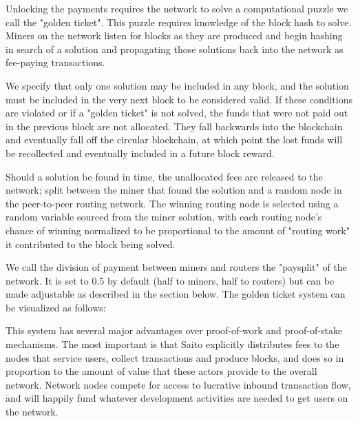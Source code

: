 \documentclass[11pt, oneside]{article}   	%
\begin{document}
\begin{multicols}{2}
Unlocking the payments requires the network to solve a computational puzzle we call the "golden ticket". This puzzle requires knowledge of the block hash to solve. Miners on the network listen for blocks as they are produced and begin hashing in search of a solution and propagating those solutions back into the network as fee-paying transactions. 

We specify that only one solution may be included in any block, and the solution must be included in the very next block to be considered valid. If these conditions are violated or if a "golden ticket" is not solved, the funds that were not paid out in the previous block are not allocated. They fall backwards into the blockchain and eventually fall off the circular blockchain, at which point the lost funds will be recollected and eventually included in a future block reward. 

Should a solution be found in time, the unallocated fees are released to the network; split between the miner that found the solution and a random node in the peer-to-peer routing network. The winning routing node is selected using a random variable sourced from the miner solution, with each routing node's chance of winning normalized to be proportional to the amount of "routing work" it contributed to the block being solved.

We call the division of payment between miners and routers the "paysplit" of the network. It is set to 0.5 by default (half to miners, half to routers) but can be made adjustable as described in the section below. The golden ticket system can be visualized as follows:


This system has several major advantages over proof-of-work and proof-of-stake mechanisms. The most important is that Saito explicitly distributes fees to the nodes that service users, collect transactions and produce blocks, and does so in proportion to the amount of value that these actors provide to the overall network. Network nodes compete for access to lucrative inbound transaction flow, and will happily fund whatever development activities are needed to get users on the network.


\end{multicols}
\end{document}
